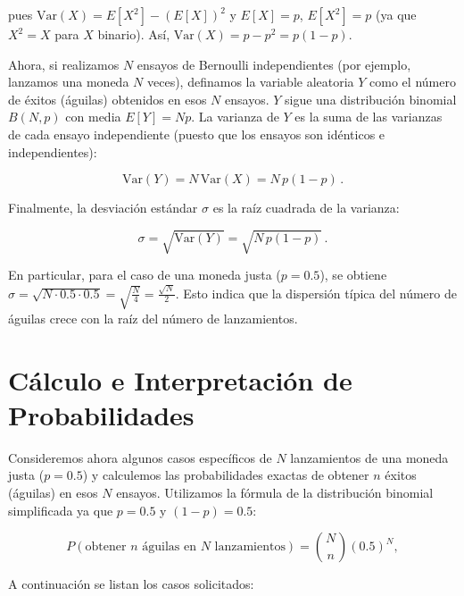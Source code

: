 \documentclass[11pt,letterpaper]{article}
\begin{document}
pues $\mathrm{Var}(X) = E[X^2] - (E[X])^2$ y $E[X] = p$, $E[X^2] = p$ (ya que $X^2 = X$ para $X$ binario). Así, $\mathrm{Var}(X) = p - p^2 = p(1-p)$.

Ahora, si realizamos $N$ ensayos de Bernoulli independientes (por ejemplo, lanzamos una moneda $N$ veces), definamos la variable aleatoria $Y$ como el número de éxitos (águilas) obtenidos en esos $N$ ensayos. $Y$ sigue una distribución binomial $B(N, p)$ con media $E[Y] = Np$. La varianza de $Y$ es la suma de las varianzas de cada ensayo independiente (puesto que los ensayos son idénticos e independientes): 

$$
\mathrm{Var}(Y) = N \, \mathrm{Var}(X) = N \, p(1-p)\,. 
$$ 

Finalmente, la desviación estándar $\sigma$ es la raíz cuadrada de la varianza:

$$
\sigma = \sqrt{\mathrm{Var}(Y)} = \sqrt{N\,p(1-p)}\,.
$$

En particular, para el caso de una moneda justa ($p=0.5$), se obtiene $\sigma = \sqrt{N \cdot 0.5 \cdot 0.5} = \sqrt{\frac{N}{4}} = \frac{\sqrt{N}}{2}$. Esto indica que la dispersión típica del número de águilas crece con la raíz del número de lanzamientos.

\section{Cálculo e Interpretación de Probabilidades}

Consideremos ahora algunos casos específicos de $N$ lanzamientos de una moneda justa ($p=0.5$) y calculemos las probabilidades exactas de obtener $n$ éxitos (águilas) en esos $N$ ensayos. Utilizamos la fórmula de la distribución binomial simplificada ya que $p=0.5$ y $(1-p)=0.5$: 

\[ 
P(\text{obtener } n \text{ águilas en } N \text{ lanzamientos}) = \binom{N}{\,n\,} (0.5)^N, 
\] 

A continuación se listan los casos solicitados:
\end{document}

